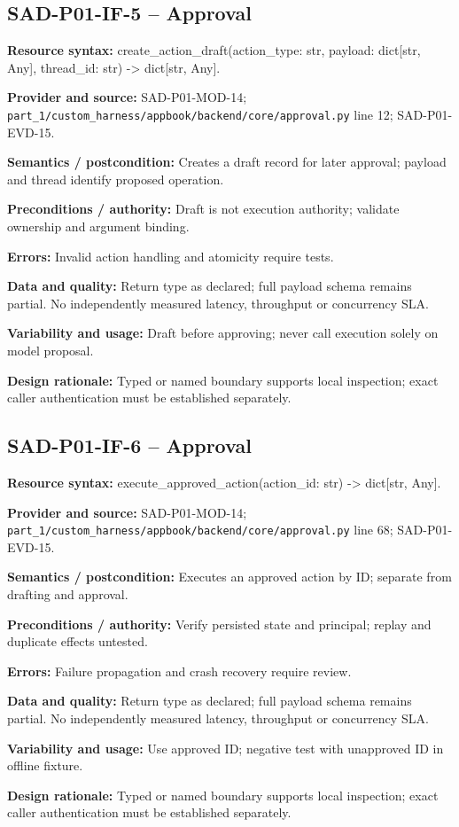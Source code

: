 \documentclass[10pt,letterpaper]{article}
\begin{document}
\subsection{SAD-P01-IF-5 -- Approval}
{\raggedright \textbf{Resource syntax:} create\_\allowbreak{}action\_\allowbreak{}draft(\allowbreak{}action\_\allowbreak{}type: str, payload: dict[str, Any], thread\_\allowbreak{}id: str) -> dict[str, Any].\par}
\textbf{Provider and source:} SAD-P01-MOD-14; \nolinkurl{part_1/custom_harness/appbook/backend/core/approval.py} line 12; SAD-P01-EVD-15.\par
\textbf{Semantics / postcondition:} Creates a draft record for later approval; payload and thread identify proposed operation.\par
\textbf{Preconditions / authority:} Draft is not execution authority; validate ownership and argument binding.\par
\textbf{Errors:} Invalid action handling and atomicity require tests.\par
\textbf{Data and quality:} Return type as declared; full payload schema remains partial. No independently measured latency, throughput or concurrency SLA.\par
\textbf{Variability and usage:} Draft before approving; never call execution solely on model proposal.\par
\textbf{Design rationale:} Typed or named boundary supports local inspection; exact caller authentication must be established separately.\par

\subsection{SAD-P01-IF-6 -- Approval}
{\raggedright \textbf{Resource syntax:} execute\_\allowbreak{}approved\_\allowbreak{}action(\allowbreak{}action\_\allowbreak{}id: str) -> dict[str, Any].\par}
\textbf{Provider and source:} SAD-P01-MOD-14; \nolinkurl{part_1/custom_harness/appbook/backend/core/approval.py} line 68; SAD-P01-EVD-15.\par
\textbf{Semantics / postcondition:} Executes an approved action by ID; separate from drafting and approval.\par
\textbf{Preconditions / authority:} Verify persisted state and principal; replay and duplicate effects untested.\par
\textbf{Errors:} Failure propagation and crash recovery require review.\par
\textbf{Data and quality:} Return type as declared; full payload schema remains partial. No independently measured latency, throughput or concurrency SLA.\par
\textbf{Variability and usage:} Use approved ID; negative test with unapproved ID in offline fixture.\par
\textbf{Design rationale:} Typed or named boundary supports local inspection; exact caller authentication must be established separately.\par
\end{document}
